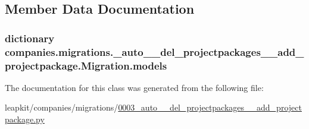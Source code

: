 \subsection{Member Data Documentation}
\hypertarget{classcompanies_1_1migrations_1_10003__auto____del__projectpackages____add__projectpackage_1_1_migration_ad1d25fef729cf8c6e216d5831fb257b7}{
\subsubsection[{models}]{\setlength{\rightskip}{0pt plus 5cm}dictionary companies.\-migrations.\-\_\-auto\-\_\-\-\_\-del\-\_\-projectpackages\-\_\-\-\_\-add\-\_\-projectpackage.\-Migration.\-models\hspace{0.3cm}{\ttfamily [static]}}}\label{classcompanies_1_1migrations_1_10003__auto____del__projectpackages____add__projectpackage_1_1_migration_ad1d25fef729cf8c6e216d5831fb257b7}


The documentation for this class was generated from the following file\-:\begin{DoxyCompactItemize}
\item 
leapkit/companies/migrations/\hyperlink{0003__auto____del__projectpackages____add__projectpackage_8py}{0003\-\_\-auto\-\_\-\-\_\-del\-\_\-projectpackages\-\_\-\-\_\-add\-\_\-projectpackage.\-py}\end{DoxyCompactItemize}
